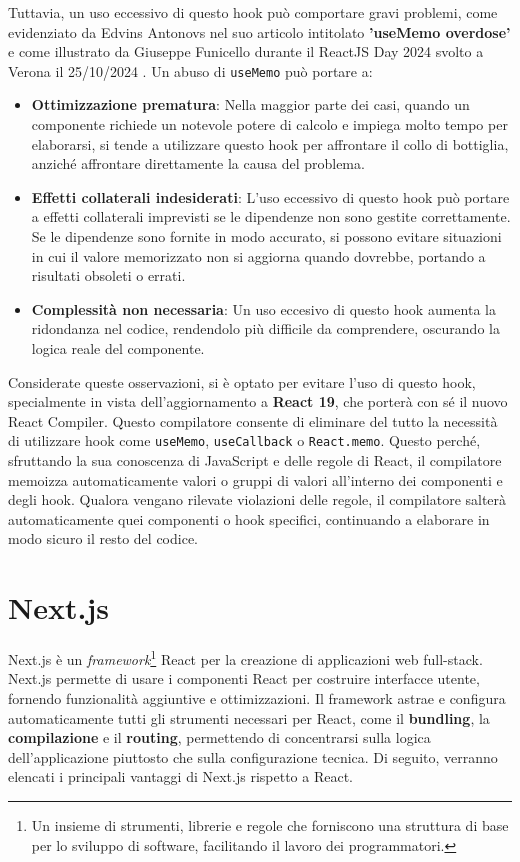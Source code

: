 \documentclass[target=bach,aauheader=,style=]{thud}
\begin{document}
\noindent Tuttavia, un uso eccessivo di questo hook può comportare gravi problemi, come evidenziato da Edvins Antonovs nel suo articolo intitolato \textbf{'useMemo overdose'} \cite{edvins2024usememo} e come illustrato da Giuseppe Funicello durante il ReactJS Day 2024 svolto a Verona il 25/10/2024 \cite{funicello2024reactjsday}. Un abuso di \texttt{useMemo} può portare a:

\begin{itemize}
    \item \textbf{Ottimizzazione prematura}: Nella maggior parte dei casi, quando un componente richiede un notevole potere di calcolo e impiega molto tempo per elaborarsi, si tende a utilizzare questo hook per affrontare il collo di bottiglia, anziché affrontare direttamente la causa del problema.
    \item \textbf{Effetti collaterali indesiderati}: L'uso eccessivo di questo hook può portare a effetti collaterali imprevisti se le dipendenze non sono gestite correttamente. Se le dipendenze sono fornite in modo accurato, si possono evitare situazioni in cui il valore memorizzato non si aggiorna quando dovrebbe, portando a risultati obsoleti o errati.
    \item \textbf{Complessità non necessaria}: Un uso eccesivo di questo hook aumenta la ridondanza nel codice, rendendolo più difficile da comprendere, oscurando la logica reale del componente.
\end{itemize}

\noindent Considerate queste osservazioni, si è optato per evitare l'uso di questo hook, specialmente in vista dell'aggiornamento a \textbf{React 19}, che porterà con sé il nuovo React Compiler. Questo compilatore consente di eliminare del tutto la necessità di utilizzare hook come \texttt{useMemo}, \texttt{useCallback} o \texttt{React.memo}. Questo perché, sfruttando la sua conoscenza di JavaScript e delle regole di React, il compilatore memoizza automaticamente valori o gruppi di valori all'interno dei componenti e degli hook. Qualora vengano rilevate violazioni delle regole, il compilatore salterà automaticamente quei componenti o hook specifici, continuando a elaborare in modo sicuro il resto del codice.



\section{Next.js}
Next.js \cite{nextjsdocs2024} è un \textit{framework}\footnote{Un insieme di strumenti, librerie e regole che forniscono una struttura di base per lo sviluppo di software, facilitando il lavoro dei programmatori.} React per la creazione di applicazioni web full-stack. Next.js permette di usare i componenti React per costruire interfacce utente, fornendo funzionalità aggiuntive e ottimizzazioni. Il framework astrae e configura automaticamente tutti gli strumenti necessari per React, come il \textbf{bundling}, la \textbf{compilazione} e il \textbf{routing}, permettendo di concentrarsi sulla logica dell'applicazione piuttosto che sulla configurazione tecnica. Di seguito, verranno elencati i principali vantaggi di Next.js rispetto a React.
\end{document}
